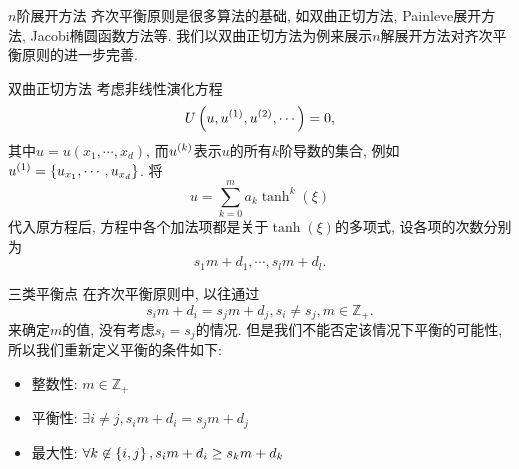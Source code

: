 \begin{frame}{$n$阶展开方法}
齐次平衡原则是很多算法的基础, 如双曲正切方法, Painleve展开方法, Jacobi椭圆函数方法等. 我们以双曲正切方法为例来展示$n$解展开方法对齐次平衡原则的进一步完善. 
\end{frame}




\begin{frame}{双曲正切方法}
考虑非线性演化方程 
\[
    U\left(u,u^{(1)},u^{(2)},\cdots\right)=0, 
\]
其中$u=u(x_1,\cdots,x_d)$, 而$u^{(k)}$表示$u$的所有$k$阶导数的集合, 例如$u^{(1)}=\left\{u_{x_1},\cdots,u_{x_d}\right\}$. 
将
\[
    u=\sum_{k=0}^{m}{a_k\tanh^k(\xi)}
\]
代入原方程后, 方程中各个加法项都是关于$\tanh(\xi)$的多项式, 设各项的次数分别为 
\[
    s_1 m+d_1,\cdots,s_l m + d_l . 
\]
\end{frame}

\begin{frame}{三类平衡点}
在齐次平衡原则中, 以往通过
\[
    s_i m+d_i=s_j m+d_j, s_i\neq s_j , m\in \mathbb Z_+. 
\]
来确定$m$的值, 没有考虑$s_i=s_j$的情况. 但是我们不能否定该情况下平衡的可能性, 所以我们重新定义平衡的条件如下:
\begin{itemize}
    \item 整数性: $ m\in \mathbb Z_+$ 
    \item 平衡性: $\exists i\neq j, s_i m+d_i=s_j m+d_j $
    \item 最大性: $\forall k \not\in \left\{i,j\right\}, s_i m+d_i\ge s_k m+d_k $
\end{itemize}
\end{frame}

